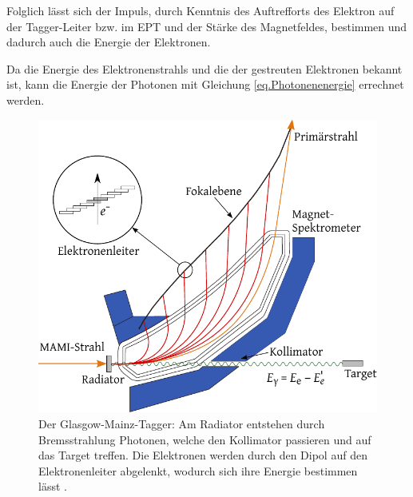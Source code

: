 \documentclass[a4paper,11pt,oneside,final,german,openbib,pdftex]{scrbook}
\begin{document}
{ Folglich lässt sich der Impuls, durch Kenntnis des Auftrefforts des Elektron auf der Tagger-Leiter bzw. im EPT und der St\"arke des Magnetfeldes, bestimmen und dadurch auch die Energie der Elektronen. 
 
 Da die Energie des Elektronenstrahls und die der gestreuten Elektronen bekannt ist, kann die Energie der Photonen mit Gleichung \ref{eq.Photonenenergie} errechnet werden.
\newline 
\begin{figure}[h!]
	\begin{center}
	\includegraphics{TAGGER-New}
	
	\caption[Prinzip des Glasgow-Mainz-Taggers]{Der Glasgow-Mainz-Tagger: Am Radiator entstehen durch Bremsstrahlung Photonen, welche den Kollimator passieren und auf das Target treffen. Die Elektronen werden durch den Dipol auf den Elektronenleiter abgelenkt, wodurch sich ihre Energie bestimmen lässt \cite{Un08}.}
\label{fig.TAGGER}	
\end{center}
\end{figure}
 
}
\end{document}
